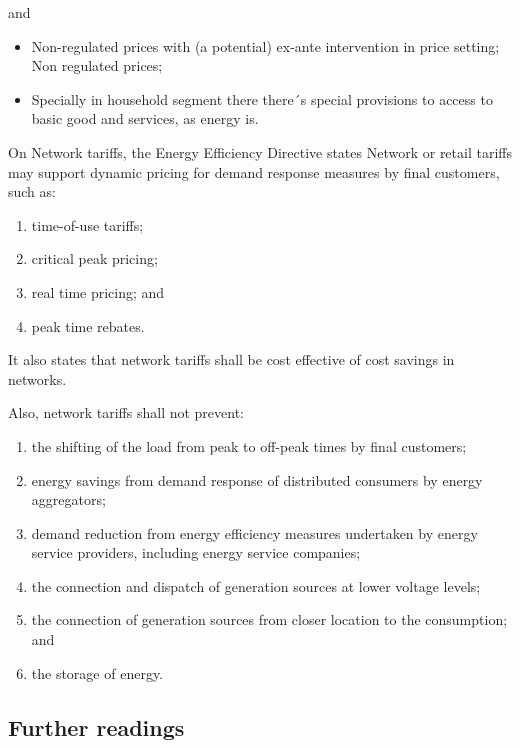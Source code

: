 \documentclass[]{book}
\providecommand{\tightlist}{%
  \setlength{\itemsep}{0pt}\setlength{\parskip}{0pt}}
\theoremstyle{definition}
\theoremstyle{definition}
\theoremstyle{definition}
\theoremstyle{remark}
\begin{document}
and

\begin{itemize}
\item
  Non-regulated prices with (a potential) ex-ante intervention in price
  setting; Non regulated prices;
\item
  Specially in household segment there there´s special provisions to
  access to basic good and services, as energy is.
\end{itemize}

On Network tariffs, the Energy Efficiency Directive states Network or
retail tariffs may support dynamic pricing for demand response measures
by final customers, such as:

\begin{enumerate}
\def\labelenumi{(\alph{enumi})}
\tightlist
\item
  time-of-use tariffs;
\item
  critical peak pricing;
\item
  real time pricing; and
\item
  peak time rebates.
\end{enumerate}

It also states that network tariffs shall be cost effective of cost
savings in networks.

Also, network tariffs shall not prevent:

\begin{enumerate}
\def\labelenumi{(\alph{enumi})}
\tightlist
\item
  the shifting of the load from peak to off-peak times by final
  customers;
\item
  energy savings from demand response of distributed consumers by energy
  aggregators;
\item
  demand reduction from energy efficiency measures undertaken by energy
  service providers, including energy service companies;
\item
  the connection and dispatch of generation sources at lower voltage
  levels;
\item
  the connection of generation sources from closer location to the
  consumption; and
\item
  the storage of energy.
\end{enumerate}

\subsection{Further readings}\label{further-readings}
\end{document}
